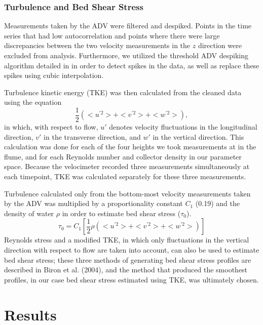 \documentclass{scrreprt}
\begin{document}
\subsection{Turbulence and Bed Shear Stress}
Measurements taken by the ADV were filtered and despiked. Points in the time series that had low autocorrelation and points where there were large discrepancies between the two velocity measurements in the $z$ direction were excluded from analysis. Furthermore, we utilized the threshold ADV despiking algorithm detailed in \cite{goring_nikora} in order to detect spikes in the data, as well as replace these spikes using cubic interpolation.

Turbulence kinetic energy (TKE) was then calculated from the cleaned data using the equation 
\[\frac{1}{2}(<u^{'2}> + <v^{'2}> + <w^{'2}>),\]
in which, with respect to flow, $u'$ denotes velocity fluctuations in the longitudinal direction, $v'$ in the transverse direction, and $w'$ in the vertical direction. This calculation was done for each of the four heights we took measurements at in the flume, and for each Reynolds number and collector density in our parameter space. Because the velocimeter recorded three measurements simultaneously at each timepoint, TKE was calculated separately for these three measurements. 

Turbulence calculated only from the bottom-most velocity measurements taken by the ADV was multiplied by a proportionality constant $C_{1}$ (0.19) and the density of water $\rho$ in order to estimate bed shear stress ($\tau_{0}$).
\[\tau_{0} = C_{1}[\frac{1}{2}\rho(<u^{'2}> + <v^{'2}> + <w^{'2}>)]\]
Reynolds stress and a modified TKE, in which only fluctuations in the vertical direction with respect to flow are taken into account, can also be used to estimate bed shear stress; these three methods of generating bed shear stress profiles are described in Biron et al. (2004), and the method that produced the smoothest profiles, in our case bed shear stress estimated using TKE, was ultimately chosen.  


\chapter{Results}
\end{document}
